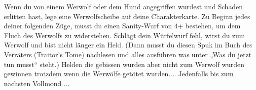 Wenn du von einem Werwolf oder dem Hund angegriffen wurdest und Schaden erlitten hast, lege eine Werwolfscheibe auf deine Charakterkarte. Zu Beginn jedes deiner folgenden Züge, musst du einen Sanity-Wurf von 4+ bestehen, um dem Fluch des Werwolfs zu widerstehen. Schlägt dein Würfelwurf fehl, wirst du zum Werwolf und bist nicht länger ein Held. (Dann musst du diesen Spuk im Buch des Verräters (Traitor's Tome) nachlesen und alles ausführen was unter „Was du jetzt tun musst“ steht.)
Helden die gebissen wurden aber nicht zum Werwolf wurden gewinnen trotzdem wenn die Werwölfe getötet wurden.... Jedenfalls bis zum nächsten Vollmond ...


